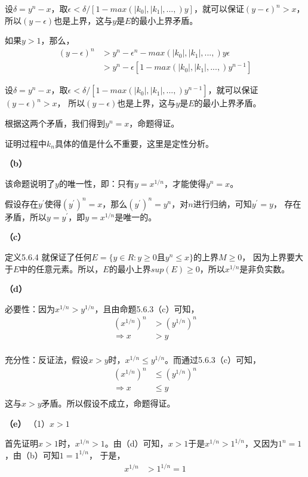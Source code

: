 \documentclass{article}
\theoremstyle{mystyle}
\begin{document}
设$\delta = y^n - x$，取$\epsilon < \delta / [1-max(|k_0|,|k_1|,...,)y]$，就可以保证$(y - \epsilon)^n > x$，
所以$(y-\epsilon)$也是上界，这与$y$是$E$的最小上界矛盾。

如果$y > 1$，那么，
\begin{align}
  (y - \epsilon)^n & > y^n - \epsilon^n - max(|k_0|,|k_1|,...,)y\epsilon \\
                   & > y^n - \epsilon[1-max(|k_0|,|k_1|,...,)y^{n-1}]
\end{align}

设$\delta = y^n - x$，取$\epsilon < \delta / [1-max(|k_0|,|k_1|,...,)y^{n-1}]$，就可以保证$(y - \epsilon)^n > x$，
所以$(y-\epsilon)$也是上界，这与$y$是$E$的最小上界矛盾。

根据这两个矛盾，我们得到$y^n = x$，命题得证。

证明过程中$k_n$具体的值是什么不重要，这里是定性分析。

\textbf{（b）}

该命题说明了$y$的唯一性，即：只有$y=x^{1/n}$，才能使得$y^n = x$。

假设存在$y^\prime$使得$(y^\prime)^n = x$，那么$(y^\prime)^n = y^n$，对$n$进行归纳，可知$y^\prime = y$，
存在矛盾，所以$y=y^\prime$，即$y=x^{1/n}$是唯一的。

\textbf{（c）}

定义5.6.4 就保证了任何$E=\{y \in R: y \geq 0 \text{且} y^n \leq x\}$的上界$M \geq 0$，
因为上界要大于$E$中的任意元素。所以，$E$的最小上界$sup(E) \geq 0$，所以$x^{1/n}$是非负实数。

\textbf{（d）}

必要性：因为$x^{1/n} > y^{1/n}$，且由命题5.6.3（c）可知，
\begin{align*}
  (x^{1/n})^n   & > (y^{1/n})^n \\
  \Rightarrow x & > y           \\
\end{align*}

充分性：反证法，假设$x > y$时，$x^{1/n} \leq y^{1/n}$。而通过5.6.3（c）可知，
\begin{align*}
  (x^{1/n})^n   & \leq (y^{1/n})^n \\
  \Rightarrow x & \leq y           \\
\end{align*}
这与$x > y$矛盾。所以假设不成立，命题得证。

\textbf{（e）}
（1）$x>1$

首先证明$x>1$时，$x^{1/n}>1$。由（d）可知，$x>1$于是$x^{1/n} > 1^{1/n}$，又因为$1^n=1$，由（b）可知$1=1^{1/n}$，
于是，
\begin{align*}
  x^{1/n} & > 1^{1/n} = 1
\end{align*}
\end{document}
